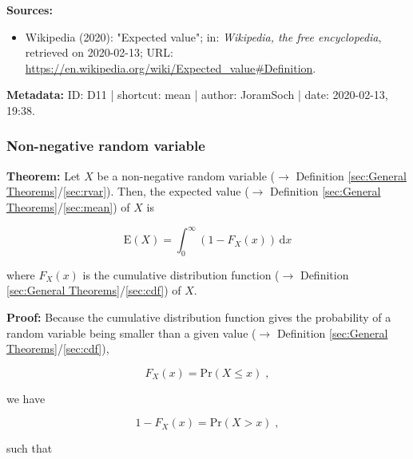 \documentclass[a4paper,12pt,twoside]{book}
\begin{document}
\vspace{1em}
\textbf{Sources:}
\begin{itemize}
\item Wikipedia (2020): "Expected value"; in: \textit{Wikipedia, the free encyclopedia}, retrieved on 2020-02-13; URL: \url{https://en.wikipedia.org/wiki/Expected_value#Definition}.
\end{itemize}


\vspace{1em}
\textbf{Metadata:} ID: D11 | shortcut: mean | author: JoramSoch | date: 2020-02-13, 19:38.
\vspace{1em}



\subsubsection[\textbf{Non-negative random variable}]{Non-negative random variable} \label{sec:mean-nnrvar}
\setcounter{equation}{0}

\textbf{Theorem:} Let $X$ be a non-negative random variable ($\rightarrow$ Definition \ref{sec:General Theorems}/\ref{sec:rvar}). Then, the expected value ($\rightarrow$ Definition \ref{sec:General Theorems}/\ref{sec:mean}) of $X$ is

\begin{equation} \label{eq:mean-nnrvar-mean-cdf}
\mathrm{E}(X) = \int_{0}^{\infty} (1 - F_X(x)) \, \mathrm{d}x
\end{equation}

where $F_X(x)$ is the cumulative distribution function ($\rightarrow$ Definition \ref{sec:General Theorems}/\ref{sec:cdf}) of $X$.


\vspace{1em}
\textbf{Proof:} Because the cumulative distribution function gives the probability of a random variable being smaller than a given value ($\rightarrow$ Definition \ref{sec:General Theorems}/\ref{sec:cdf}),

\begin{equation} \label{eq:mean-nnrvar-cdf-Pr-leq}
F_X(x) = \mathrm{Pr}(X \leq x) \; ,
\end{equation}

we have

\begin{equation} \label{eq:mean-nnrvar-cdf-Pr-geq}
1 - F_X(x) = \mathrm{Pr}(X > x) \; ,
\end{equation}

such that
\end{document}
